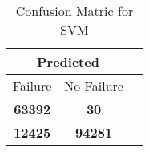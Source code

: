 \begin{table}[] 
\caption{Confusion Matric for SVM} 
\label{Table: Prediction Accuracy-LOFSVMSVMEKF-ignoresolarPanelDipole-solarPanelDipole} 
\centering 
\begin{tabular} 
 {@{}ccc@{}} 
\toprule 
\multicolumn{2}{c}{\textbf{Predicted}}
 \\ \midrule 
\multicolumn{1}{|c|}{Failure} & 
\multicolumn{1}{c|}{No Failure}
 \\ \midrule 
\multicolumn{1}{|c|}{\color{green}\textbf{63392}} & 
\multicolumn{1}{c|}{\color{red}\textbf{30}}
 \\ \midrule 
\multicolumn{1}{|c|}{\color{red}\textbf{12425}} & 
\multicolumn{1}{c|}{\color{green}\textbf{94281}}
 \\ \bottomrule 
\end{tabular} 
\end{table} 
